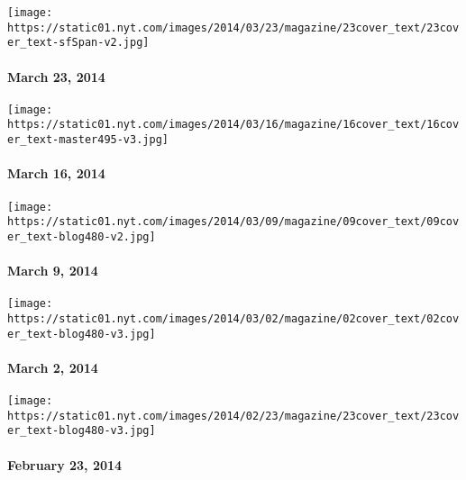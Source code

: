 \href{http://www.nytimes.com/indexes/2014/03/23/magazine/index.html}{}

\texttt{[image: https://static01.nyt.com/images/2014/03/23/magazine/23cover\_text/23cover\_text-sfSpan-v2.jpg]}

\hypertarget{march-23-2014}{%
\paragraph{March 23, 2014}\label{march-23-2014}}

\href{http://www.nytimes.com/indexes/2014/03/16/magazine/index.html}{}

\texttt{[image: https://static01.nyt.com/images/2014/03/16/magazine/16cover\_text/16cover\_text-master495-v3.jpg]}

\hypertarget{march-16-2014}{%
\paragraph{March 16, 2014}\label{march-16-2014}}

\href{http://www.nytimes.com/indexes/2014/03/09/magazine/index.html}{}

\texttt{[image: https://static01.nyt.com/images/2014/03/09/magazine/09cover\_text/09cover\_text-blog480-v2.jpg]}

\hypertarget{march-9-2014}{%
\paragraph{March 9, 2014}\label{march-9-2014}}

\href{http://www.nytimes.com/indexes/2014/03/02/magazine/index.html}{}

\texttt{[image: https://static01.nyt.com/images/2014/03/02/magazine/02cover\_text/02cover\_text-blog480-v3.jpg]}

\hypertarget{march-2-2014}{%
\paragraph{March 2, 2014}\label{march-2-2014}}

\href{http://www.nytimes.com/indexes/2014/02/23/magazine/index.html}{}

\texttt{[image: https://static01.nyt.com/images/2014/02/23/magazine/23cover\_text/23cover\_text-blog480-v3.jpg]}

\hypertarget{february-23-2014}{%
\paragraph{February 23, 2014}\label{february-23-2014}}

